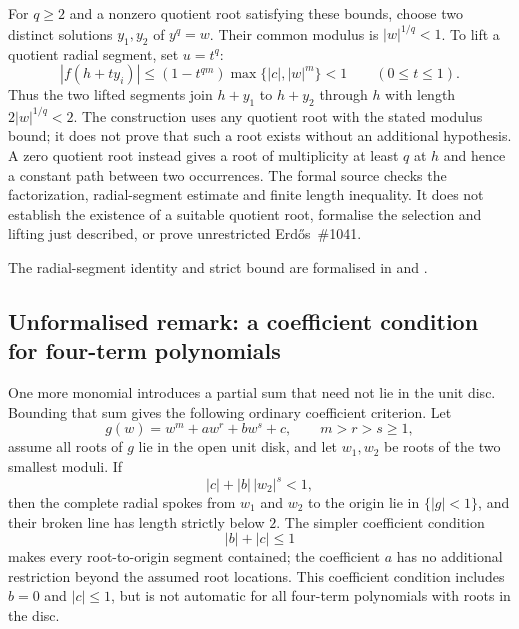 For $q\ge2$ and a nonzero quotient root satisfying these bounds, choose
two distinct solutions $y_1,y_2$ of $y^q=w$. Their common modulus is
$|w|^{1/q}<1$. To lift a quotient radial segment, set $u=t^q$:
\[
 |f(h+ty_i)|
 \le (1-t^{qm})\max\{|c|,|w|^m\}<1
 \qquad(0\le t\le1).
\]
Thus the two lifted segments join $h+y_1$ to $h+y_2$ through $h$
with length $2|w|^{1/q}<2$. The construction uses any quotient root
with the stated modulus bound; it does not prove that such a root
exists without an additional hypothesis. A zero quotient root instead
gives a root of multiplicity at least $q$ at $h$ and hence a constant
path between two occurrences. The formal source checks the
factorization, radial-segment estimate and finite length inequality.
It does not establish the existence of a suitable quotient root,
formalise the selection and lifting just described, or prove
unrestricted Erd\H{o}s~\#1041.

The radial-segment identity and strict bound are formalised in
and .

\subsection*{Unformalised remark: a coefficient condition for four-term polynomials}

One more monomial introduces a partial sum that need not lie in the
unit disc. Bounding that sum gives the following ordinary coefficient
criterion. Let
\[
  g(w)=w^m+aw^r+bw^s+c,\qquad m>r>s\ge1,
\]
assume all roots of $g$ lie in the open unit disk, and let $w_1,w_2$ be roots
of the two smallest moduli.  If
\[
  |c|+|b|\,|w_2|^s<1,
\]
then the complete radial spokes from $w_1$ and $w_2$ to the origin lie in
$\{|g|<1\}$, and their broken line has length strictly below $2$.  The simpler
coefficient condition
\[
  |b|+|c|\le1
\]
makes every root-to-origin segment contained; the coefficient $a$ has
no additional restriction beyond the assumed root locations. This coefficient
condition includes $b=0$ and $|c|\le1$, but is not automatic for all
four-term polynomials with roots in the disc.

